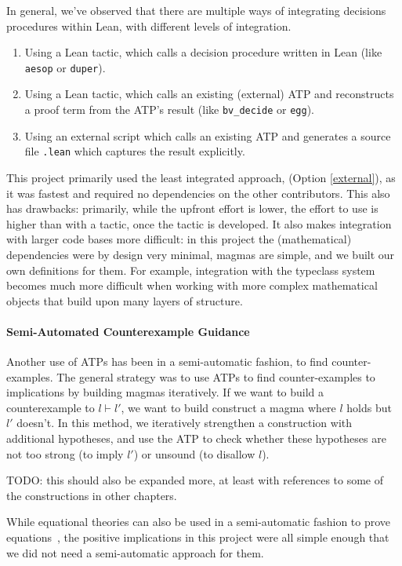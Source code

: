In general, we've observed that there are multiple ways of integrating decisions procedures within Lean, with different levels of integration.
\begin{enumerate}
    \item Using a Lean tactic, which calls a decision procedure written in Lean (like \texttt{aesop} or \texttt{duper}).
    \item Using a Lean tactic, which calls an existing (external) ATP and reconstructs a proof term from the ATP's result (like \texttt{bv\_decide} or \texttt{egg}).
    \item\label{external} Using an external script which calls an existing ATP and generates a source file \texttt{.lean} which captures the result explicitly.
\end{enumerate}


This project primarily used the least integrated approach, (Option \ref{external}), as it was fastest and required no dependencies on the other contributors.
This also has drawbacks: primarily, while the upfront effort is lower, the effort to use is higher than with a tactic, once the tactic is developed.
It also makes integration with larger code bases more difficult: in this project the (mathematical) dependencies were by design very minimal, magmas are simple, and we built our own definitions for them.
For example, integration with the typeclass system becomes much more difficult when working with more complex mathematical objects that build upon many layers of structure.

\paragraph{Semi-Automated Counterexample Guidance}

Another use of ATPs has been in a semi-automatic fashion, to find counter-examples.
The general strategy was to use ATPs to find counter-examples to implications by building magmas iteratively.
If we want to build a counterexample to $l \vdash l'$, we want to build construct a magma where $l$ holds but $l'$ doesn't.
In this method, we iteratively strengthen a construction with additional hypotheses, and use the ATP to check whether these hypotheses are not too strong (to imply $l'$) or unsound (to disallow $l$).

TODO: this should also be expanded more, at least with references to some of the constructions in other chapters.

While equational theories can also be used in a semi-automatic fashion to prove equations~\cite{DBLP:journals/pacmpl/KoehlerGBGTS24}, the positive implications in this project were all simple enough that we did not need a semi-automatic approach for them.

